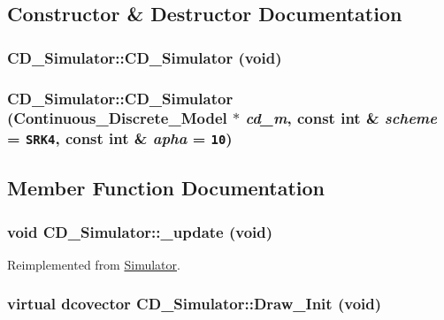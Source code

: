 \subsection{Constructor \& Destructor Documentation}
\hypertarget{class_c_d___simulator_c606f9720c399f258cbe89f24eecf83e}{
\subsubsection[{CD\_\-Simulator}]{\setlength{\rightskip}{0pt plus 5cm}CD\_\-Simulator::CD\_\-Simulator (void)}}
\label{class_c_d___simulator_c606f9720c399f258cbe89f24eecf83e}


\hypertarget{class_c_d___simulator_e0a636e36d9c7821b34271d451b3b5a4}{
\subsubsection[{CD\_\-Simulator}]{\setlength{\rightskip}{0pt plus 5cm}CD\_\-Simulator::CD\_\-Simulator ({\bf Continuous\_\-Discrete\_\-Model} $\ast$ {\em cd\_\-m}, \/  const int \& {\em scheme} = {\tt SRK4}, \/  const int \& {\em apha} = {\tt 10})}}
\label{class_c_d___simulator_e0a636e36d9c7821b34271d451b3b5a4}




\subsection{Member Function Documentation}
\hypertarget{class_c_d___simulator_efc4b4521a9d4cd6658c16feb9233e14}{
\subsubsection[{\_\-update}]{\setlength{\rightskip}{0pt plus 5cm}void CD\_\-Simulator::\_\-update (void)}}
\label{class_c_d___simulator_efc4b4521a9d4cd6658c16feb9233e14}




Reimplemented from \hyperlink{class_simulator_d4aa197c02a87ff2653b54c0b9207a33}{Simulator}.\hypertarget{class_c_d___simulator_cbdbea3e487026be0c032d2218d27b2b}{
\subsubsection[{Draw\_\-Init}]{\setlength{\rightskip}{0pt plus 5cm}virtual dcovector CD\_\-Simulator::Draw\_\-Init (void)}}
\label{class_c_d___simulator_cbdbea3e487026be0c032d2218d27b2b}


